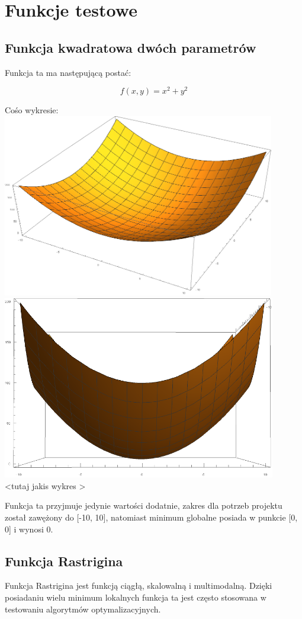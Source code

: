 \documentclass[twoside]{projektInzynierskiMS1}
\newcommand{\si}{ś}
\begin{document}
\section{Funkcje testowe}
	\subsection{Funkcja kwadratowa dwóch parametrów}
	Funkcja ta ma następującą postać:

\[f(x, y) = x^2 + y^2 \]

Co\si o wykresie:\\
\includegraphics[height=8cm]{quadraticFunction1.png}\\
\includegraphics[height=8cm]{quadraticFunction2.png}\\
<tutaj jakis wykres >

Funkcja ta przyjmuje jedynie warto\si ci dodatnie, zakres dla potrzeb projektu został zawężony do [-10, 10], natomiast minimum globalne posiada w punkcie [0, 0] i wynosi 0. 
	\subsection{Funkcja Rastrigina}
	Funkcja Rastrigina jest funkcją ciągłą, skalowalną i multimodalną. Dzięki posiadaniu wielu minimum lokalnych funkcja ta jest często stosowana w testowaniu algorytmów optymalizacyjnych. 
\end{document}
